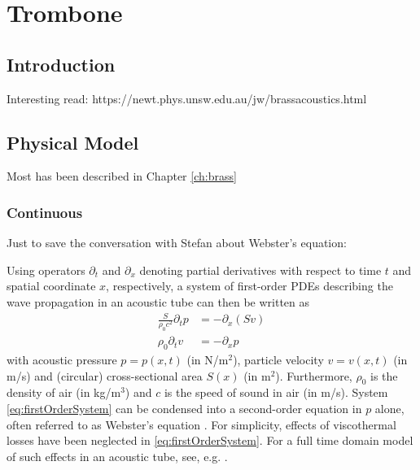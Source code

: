 \chapter{Trombone}\label{ch:trombone}
\section{Introduction}
Interesting read: https://newt.phys.unsw.edu.au/jw/brassacoustics.html
\section{Physical Model}
Most has been described in Chapter \ref{ch:brass}

\subsection{Continuous}
Just to save the conversation with Stefan about Webster's equation: 

Using operators $\partial_t$ and $\partial_x$ denoting partial derivatives with respect to time $t$ and spatial coordinate $x$, respectively, a system of first-order PDEs describing the wave propagation in an acoustic tube can then be written as
\begin{subequations}\label{eq:firstOrderSystem}
    \begin{align}
        \frac{S}{\rho_0 c^2}\partial_t p &= -\partial_x(Sv)\label{eq:contPressure}\\
        \rho_0\partial_tv &= -\partial_xp\label{eq:contVelocity}
    \end{align}
\end{subequations}
with acoustic pressure $p = p(x,t)$ (in N/m$^2$), particle velocity $v = v(x,t)$ (in m/s) and (circular) cross-sectional area $S(x)$ (in m$^2$). Furthermore, $\rho_0$ is the density of air (in kg/m$^3$) and $c$ is the speed of sound in air (in m/s). System \eqref{eq:firstOrderSystem} can be condensed into a second-order equation in $p$ alone, often referred to as Webster's equation \cite{Webster19}.    For simplicity, effects of viscothermal losses have been neglected in \eqref{eq:firstOrderSystem}. For a full time domain model of such effects in an acoustic tube, see, e.g. \cite{Bilbao2016}. 
